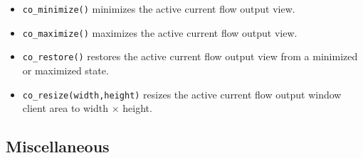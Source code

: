 \begin{itemize}
\item{\tt co\_minimize()} minimizes the active current flow output view.

\item{\tt co\_maximize()} maximizes the active current flow output view.

\item{\tt co\_restore()} restores the active current flow output view from a
 minimized or maximized state.

\item{\tt co\_resize(width,height)} resizes the active current flow output
 window client area to width $\times$ height.

\end{itemize}

\subsection{Miscellaneous}

